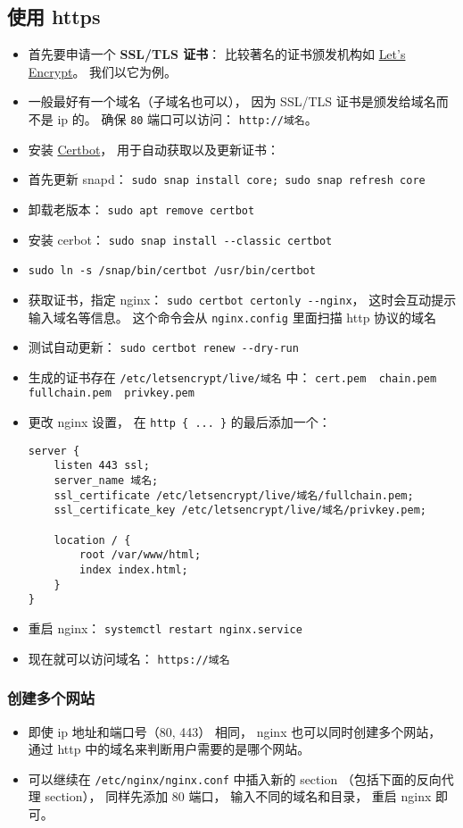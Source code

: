 \subsection{使用 https}
\begin{itemize}
\item 首先要申请一个 \textbf{SSL/TLS 证书}： 比较著名的证书颁发机构如 \href{https://letsencrypt.org/}{Let's Encrypt}。 我们以它为例。
\item 一般最好有一个域名（子域名也可以）， 因为 SSL/TLS 证书是颁发给域名而不是 ip 的。 确保 \verb|80| 端口可以访问： \verb|http://域名|。
\item 安装 \href{https://certbot.eff.org/instructions?ws=nginx&os=ubuntufocal}{Certbot}， 用于自动获取以及更新证书：
\item 首先更新 snapd： \verb|sudo snap install core; sudo snap refresh core|
\item 卸载老版本： \verb|sudo apt remove certbot|
\item 安装 cerbot： \verb|sudo snap install --classic certbot|
\item \verb|sudo ln -s /snap/bin/certbot /usr/bin/certbot|
\item 获取证书，指定 nginx： \verb|sudo certbot certonly --nginx|， 这时会互动提示输入域名等信息。 这个命令会从 \verb|nginx.config| 里面扫描 http 协议的域名
\item 测试自动更新： \verb|sudo certbot renew --dry-run|
\item 生成的证书存在 \verb|/etc/letsencrypt/live/域名| 中： \verb|cert.pem  chain.pem  fullchain.pem  privkey.pem|
\item 更改 nginx 设置， 在 \verb|http { ... }| 的最后添加一个：
\begin{lstlisting}[language=none]
server {
    listen 443 ssl;
    server_name 域名;
    ssl_certificate /etc/letsencrypt/live/域名/fullchain.pem;
    ssl_certificate_key /etc/letsencrypt/live/域名/privkey.pem;

    location / {
        root /var/www/html;
        index index.html;
    }
}
\end{lstlisting}
\item 重启 nginx： \verb|systemctl restart nginx.service|
\item 现在就可以访问域名： \verb|https://域名|
\end{itemize}

\subsubsection{创建多个网站}
\begin{itemize}
\item 即使 ip 地址和端口号（80, 443） 相同， nginx 也可以同时创建多个网站， 通过 http 中的域名来判断用户需要的是哪个网站。
\item 可以继续在 \verb|/etc/nginx/nginx.conf| 中插入新的 section （包括下面的反向代理 section）， 同样先添加 80 端口， 输入不同的域名和目录， 重启 nginx 即可。
\end{itemize}


